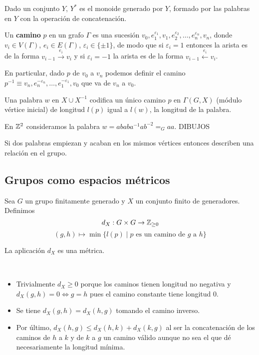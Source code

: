 \documentclass[twoside, 11pt]{article}
\begin{document}
Dado un conjunto $Y$, $Y^*$ es el monoide generado por $Y$, formado por las palabras en $Y$ con la operación de concatenación.

\begin{defi}
Un \textbf{camino} $p$ en un grafo $\Gamma$ es una sucesión $v_0,e_1^{\varepsilon_1}, v_1,e_2^{\varepsilon_2},\dots, e_n^{\varepsilon_n},v_n$, donde $v_i\in V(\Gamma)$, $e_i\in E(\Gamma)$, $\varepsilon_i\in\{\pm 1\}$, de modo que si $\varepsilon_i=1$ entonces la arista es de la forma $v_{i-1}\xrightarrow{e_i}v_{i}$ y si $\varepsilon_i=-1$ la arista es de la forma $v_{i-1}\xleftarrow{e_i}v_i$. 

En particular, dado $p$ de $v_0$ a $v_n$ podemos definir el camino $p^{-1}\equiv v_n,e_n^{-\varepsilon_n}, \dots, e_1^{-\varepsilon_1},v_0$ que va de $v_n$ a $v_0$. 
\end{defi}

Una palabra $w$ en $X\cup X^{-1}$ codifica un único camino $p$ en $\Gamma(G,X)$ (módulo vértice inicial) de longitud $l(p)$ igual a $l(w)$, la longitud de la palabra. 

\begin{ej}
En $\mathbb{Z}^2$ consideramos la palabra $w=ababa^{-1}ab^{-2}=_G aa$. DIBUJOS

Si dos palabras empiezan y acaban en los mismos vértices entonces describen una relación en el grupo. 
\end{ej}
  
\subsection{Grupos como espacios métricos}

Sea $G$ un grupo finitamente generado y $X$ un conjunto finito de generadores. Definimos
\[
d_X:G\times G\to\mathbb{Z}_{\geq 0}
\]
\[
(g,h)\mapsto\min\{l(p)\mid p\text{ es un camino de }g\text{ a }h\}
\]
\begin{prop}
La aplicación $d_X$ es una métrica.
\end{prop}
\begin{dem}\
\begin{itemize}
\item Trivialmente $d_X\geq 0$ porque los caminos tienen longitud no negativa y $d_X(g,h)=0\Leftrightarrow g=h$ pues el camino constante tiene longitud 0.
\item Se tiene $d_X(g,h)=d_X(h,g)$ tomando el camino inverso.
\item Por último, $d_X(h,g)\leq d_X(h,k)+d_X(k,g)$ al ser la concatenación de los caminos de $h$ a $k$ y de $k$ a $g$ un camino válido aunque no sea el que dé necesariamente la longitud mínima. 
\end{itemize}
\QED
\end{dem}
\end{document}
